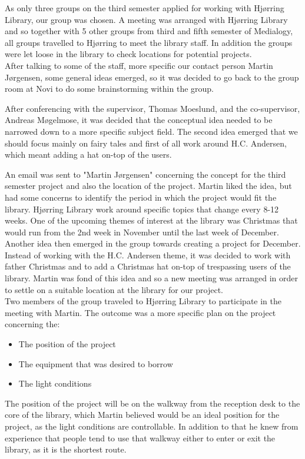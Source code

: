As only three groups on the third semester applied for working with Hjørring Library, our group was chosen. A meeting was arranged with Hjørring Library and so together with 5 other groups from third and fifth semester of Medialogy, all groups travelled to Hjørring to meet the library staff. In addition the groups were let loose in the library to check locations for potential projects.\\
After talking to some of the staff, more specific our contact person Martin Jørgensen, some general ideas emerged, so it was decided to go back to the group room at Novi to do some brainstorming within the group.


After conferencing with the supervisor, Thomas Moeslund, and the co-supervisor, Andreas Møgelmose, it was decided that the conceptual idea needed to be narrowed down to a more specific subject field. The second idea emerged that we should focus mainly on fairy tales and first of all work around H.C. Andersen, which meant adding a hat on-top of the users.

An email was sent to "Martin Jørgensen" concerning the concept for the third semester project and also the location of the project. Martin liked the idea, but had some concerns to identify the period in which the project would fit the library. Hjørring Library work around specific topics that change every 8-12 weeks. One of the upcoming themes of interest at the library was Christmas that would run from the 2nd week in November until the last week of December. Another idea then emerged in the group towards creating a project for December. Instead of working with the H.C. Andersen theme, it was decided to work with father Christmas and to add a Christmas hat on-top of trespassing users of the library. Martin was fond of this idea and so a new meeting was arranged in order to settle on a suitable location at the library for our project.\\
Two members of the group traveled to Hjørring Library to participate in the meeting with Martin. The outcome was a more specific plan on the project concerning the:

\begin{itemize}
\item The position of the project
\item The equipment that was desired to borrow
\item The light conditions
\end{itemize}

The position of the project will be on the walkway from the reception desk to the core of the library, which Martin believed would be an ideal position for the project, as the light conditions are controllable. In addition to that he knew from experience that people tend to use that walkway either to enter or exit the library, as it is the shortest route.

